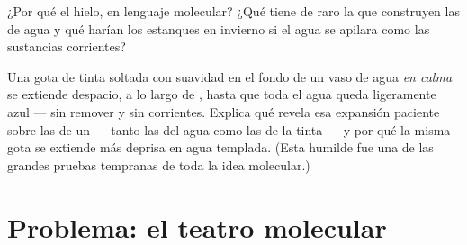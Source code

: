 \begin{exercise}[$\star\star$]\label{exo:g7:states-of-matter:11}
¿Por qué  el hielo, en lenguaje molecular? ¿Qué tiene de raro la
 que construyen las  de agua y qué harían los
estanques en invierno si el agua se apilara como las sustancias
corrientes?
\end{exercise}

\begin{exercise}[$\star\star\star$]\label{exo:g7:states-of-matter:12}
Una gota de tinta soltada con suavidad en el fondo de un vaso de agua
\emph{en calma} se extiende despacio, a lo largo de , hasta
que toda el agua queda ligeramente azul --- sin remover y sin
corrientes. Explica qué revela esa expansión paciente sobre las
 de un  --- tanto las del agua como las de
la tinta --- y por qué la misma gota se extiende más deprisa en agua
templada. (Esta humilde  fue una de las grandes pruebas
tempranas de toda la idea molecular.)
\end{exercise}

\section{Problema: el teatro molecular}

